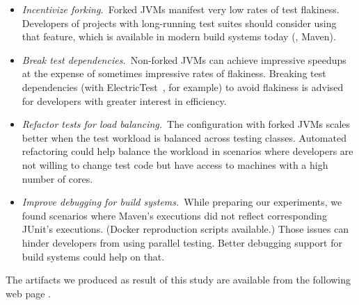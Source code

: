 \begin{itemize}
\item \emph{Incentivize forking.}~Forked JVMs manifest very low rates
  of test flakiness.  Developers of projects with long-running test
  suites should consider using that feature, which is available in
  modern build systems today (\eg{}, Maven).
\item \emph{Break test dependencies.}~Non-forked JVMs can achieve
  impressive speedups at the expense of sometimes impressive rates of
  flakiness.  Breaking test dependencies (with
  ElectricTest~\cite{bell-etal-esecfse2015}, for example) to avoid flakiness is advised for developers with
  greater interest in efficiency.
\item \emph{Refactor tests for load balancing.}~The configuration with
  forked JVMs scales
  better when the test workload is balanced
  across testing classes.  Automated refactoring could help balance
  the workload in scenarios where developers are not willing to change
  test code but have access to machines with a high number of cores.
\item \emph{Improve debugging for build systems.}~While preparing our
  experiments, we found scenarios where Maven's executions did not reflect
  corresponding JUnit's executions. (Docker reproduction scripts
  available.) Those issues can hinder developers from using parallel
  testing. Better debugging support for build systems could help
  on that. 
\end{itemize}

The artifacts we produced as result of this study are available from
the following web page \webpage{}.


